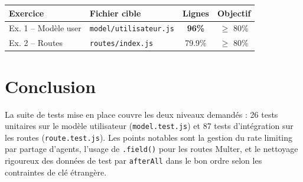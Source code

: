 \documentclass[12pt,a4paper]{article}
\begin{document}
\vspace{0.5em}
\begin{center}
\begin{tabular}{llcc}
\toprule
\textbf{Exercice} & \textbf{Fichier cible} & \textbf{Lignes} & \textbf{Objectif} \\
\midrule
Ex. 1 -- Modèle user & \texttt{model/utilisateur.js} & \textcolor{okgreen}{\textbf{96\%}} & $\geq$ 80\% \\
Ex. 2 -- Routes      & \texttt{routes/index.js}      & 79.9\% & $\geq$ 80\% \\
\bottomrule
\end{tabular}
\end{center}

\section{Conclusion}

La suite de tests mise en place couvre les deux niveaux demandés : 26 tests unitaires sur le modèle utilisateur (\texttt{model.test.js}) et 87 tests d'intégration sur les routes (\texttt{route.test.js}). Les points notables sont la gestion du rate limiting par partage d'agents, l'usage de \texttt{.field()} pour les routes Multer, et le nettoyage rigoureux des données de test par \texttt{afterAll} dans le bon ordre selon les contraintes de clé étrangère.
\end{document}
